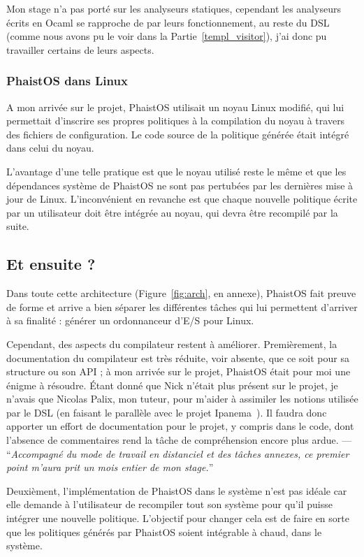 Mon stage n'a pas porté sur les analyseurs statiques, cependant les analyseurs 
écrits en Ocaml se rapproche de par leurs fonctionnement, au reste du DSL 
(comme nous avons pu le voir dans la Partie~\ref{templ_visitor}), j'ai donc pu 
travailler certains de leurs aspects.

\subsubsection{PhaistOS dans Linux}

A mon arrivée sur le projet, PhaistOS utilisait un noyau Linux modifié, qui lui 
permettait d'inscrire ses propres politiques à la compilation du noyau à 
travers des fichiers de configuration. Le code source de la politique générée 
était intégré dans celui du noyau.

L'avantage d'une telle pratique est que le noyau utilisé reste le même et que 
les dépendances système de PhaistOS ne sont pas pertubées par les dernières 
mise à jour de Linux. L'inconvénient en revanche est que chaque nouvelle 
politique écrite par un utilisateur doit être intégrée au noyau, qui devra être 
recompilé par la suite.

\subsection{Et ensuite ?}

Dans toute cette architecture (Figure~\ref{fig:arch}, en annexe), PhaistOS fait 
preuve de forme et arrive a bien séparer les différentes tâches qui lui 
permettent d'arriver à sa finalité : générer un ordonnanceur d'E/S pour Linux.

Cependant, des aspects du compilateur restent à améliorer. Premièrement, la 
documentation du compilateur est très réduite, voir absente, que ce soit pour 
sa structure ou son API ; à mon arrivée sur le projet, PhaistOS était pour moi 
une énigme à résoudre. Étant donné que Nick n'était plus présent sur le projet, 
je n'avais que Nicolas Palix, mon tuteur, pour m'aider à assimiler les notions 
utilisée par le DSL (en faisant le parallèle avec le projet Ipanema~\cite
{lepers2020provable}). Il faudra donc apporter un effort de documentation pour 
le projet, y compris dans le code, dont l'absence de commentaires rend la tâche 
de compréhension encore plus ardue. --- ``\textit{Accompagné du mode de travail 
en distanciel et des tâches annexes, ce premier point m'aura prit un mois 
entier de mon stage.}''

Deuxièment, l'implémentation de PhaistOS dans le système n'est pas idéale car 
elle demande à l'utilisateur de recompiler tout son système pour qu'il puisse 
intégrer une nouvelle politique. L'objectif pour changer cela est de faire en 
sorte que les politiques générés par PhaistOS soient intégrable à chaud, dans 
le système.

